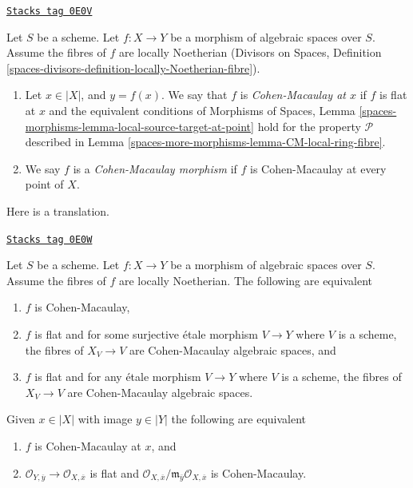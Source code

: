 \begin{definition}[CM]
\label{spaces-more-morphisms-definition-CM}
\href{https://stacks.math.columbia.edu/tag/0E0V}{\texttt{Stacks tag 0E0V}}

Let $S$ be a scheme.
Let $f : X \to Y$ be a morphism of algebraic spaces over $S$.
Assume the fibres of $f$ are locally Noetherian
(Divisors on Spaces, Definition
\ref{spaces-divisors-definition-locally-Noetherian-fibre}).
\begin{enumerate}
\item Let $x \in |X|$, and $y = f(x)$. We say that $f$ is
{\it Cohen-Macaulay at $x$} if $f$ is flat at $x$ and
the equivalent conditions of
Morphisms of Spaces, Lemma
\ref{spaces-morphisms-lemma-local-source-target-at-point}
hold for the property $\mathcal{P}$ described in
Lemma \ref{spaces-more-morphisms-lemma-CM-local-ring-fibre}.
\item We say $f$ is a {\it Cohen-Macaulay morphism} if $f$ is
Cohen-Macaulay at every point of $X$.
\end{enumerate}
\end{definition}

Here is a translation.

\begin{lemma}[CM]
\label{spaces-more-morphisms-lemma-CM}
\href{https://stacks.math.columbia.edu/tag/0E0W}{\texttt{Stacks tag 0E0W}}

Let $S$ be a scheme. Let $f : X \to Y$ be a morphism of algebraic spaces
over $S$. Assume the fibres of $f$ are locally Noetherian.
The following are equivalent
\begin{enumerate}
\item $f$ is Cohen-Macaulay,
\item $f$ is flat and for some surjective \'etale morphism $V \to Y$
where $V$ is a scheme, the fibres of $X_V \to V$
are Cohen-Macaulay algebraic spaces, and
\item $f$ is flat and for any \'etale morphism $V \to Y$
where $V$ is a scheme, the fibres of $X_V \to V$
are Cohen-Macaulay algebraic spaces.
\end{enumerate}
Given $x \in |X|$ with image $y \in |Y|$ the following are
equivalent
\begin{enumerate}
\item[(a)] $f$ is Cohen-Macaulay at $x$, and
\item[(b)] $\mathcal{O}_{Y, \overline{y}} \to \mathcal{O}_{X, \overline{x}}$
is flat and
$\mathcal{O}_{X, \overline{x}}/
\mathfrak m_{\overline{y}}\mathcal{O}_{X, \overline{x}}$ is Cohen-Macaulay.
\end{enumerate}
\end{lemma}

